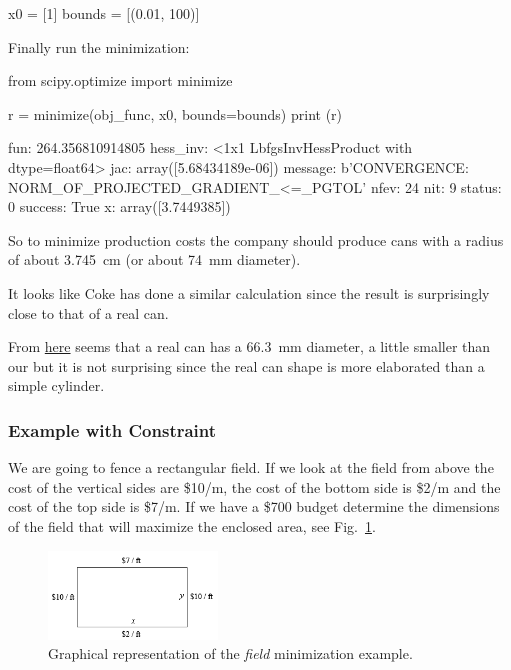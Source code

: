 \begin{ipython}
x0 = [1]
bounds = [(0.01, 100)]
\end{ipython}
\noindent
Finally run the minimization:

\begin{ipython}
from scipy.optimize import minimize

r = minimize(obj_func, x0, bounds=bounds)
print (r)
\end{ipython}
\begin{ioutput}
      fun: 264.356810914805
 hess_inv: <1x1 LbfgsInvHessProduct with dtype=float64>
      jac: array([5.68434189e-06])
  message: b'CONVERGENCE: NORM_OF_PROJECTED_GRADIENT_<=_PGTOL'
     nfev: 24
      nit: 9
   status: 0
  success: True
        x: array([3.7449385])
\end{ioutput}
So to minimize production costs the company should produce cans with a radius of about 3.745~cm (or about 74~mm diameter).

\begin{curiosity}
It looks like Coke has done a similar calculation since the result is surprisingly close to that of a real can. 

From \href{	https://www.ball.com/eu/solutions/markets-capabilities/capabilities/beverage-cans/standard-range
}{here} seems that a real can has a 66.3~mm diameter, a little smaller than our but it is not surprising since the real can shape is more elaborated than a simple cylinder.
\end{curiosity}

\subsubsection{Example with Constraint}
\label{example-with-constraint}

We are going to fence a rectangular field. If we look at the field from above the cost of the vertical sides are \$10/m, the cost of the
bottom side is \$2/m and the cost of the top side is \$7/m. If we have a \$700 budget determine
the dimensions of the field that will maximize the enclosed area, see Fig.~\ref{fig:field}.

\begin{figure}[h]
\centering
\includegraphics[width=0.4\textwidth]{figures/field.png}
\caption{Graphical representation of the \emph{field} minimization example.}
\label{fig:field}
\end{figure}

